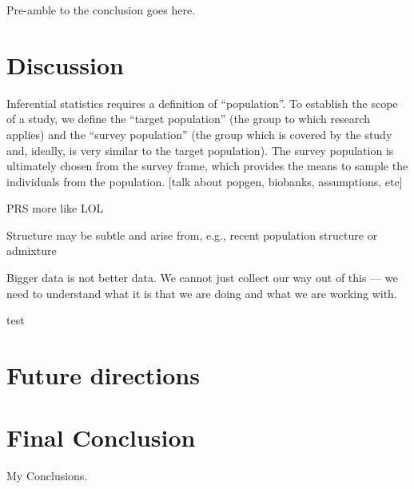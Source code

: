 Pre-amble to the conclusion goes here.

\section{Discussion}

Inferential statistics requires a definition of ``population''\citep{statcan2003}. To establish the scope of a study, we define the ``target population'' (the group to which research applies) and the ``survey population'' (the group which is covered by the study and, ideally, is very similar to the target population). The survey population is ultimately chosen from the survey frame, which provides the means to sample the individuals from the population. [talk about popgen, biobanks, assumptions, etc]

PRS more like LOL\citep{kaplan_polygenic_2022}

Structure may be subtle and arise from, e.g., recent population structure or admixture\citep{gopalan_human_2022}

Bigger data is not better data. We cannot just collect our way out of this --- we need to understand what it is that we are doing and what we are working with.

test\citep{rose_sick_2001}

\section{Future directions}

\section{Final Conclusion}
My Conclusions.